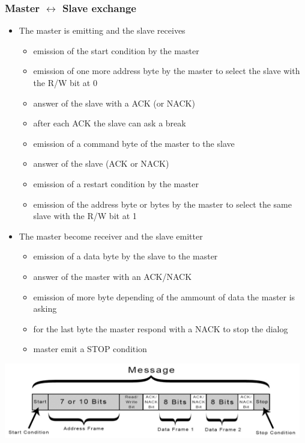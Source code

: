\documentclass[12pt,a4paper,landscape]{article}
\begin{document}
\begin{multicols}{2}
		\subsubsection*{Master $\leftrightarrow$ Slave exchange}

		\begin{itemize}
			\item The master is emitting and the slave receives
			\begin{itemize}
				\item emission of the start condition by the master
				\item emission of one more address byte by the master to select the slave with the R/W bit at 0
				\item answer of the slave with a ACK (or NACK)
				\item after each ACK the slave can ask a break
				\item emission of a command byte of the master to the slave
				\item answer of the slave (ACK or NACK)
				\item emission of a restart condition by the master
				\item emission of the address byte or bytes by the master to select the same slave with the R/W bit at 1
			\end{itemize}
			\item The master become receiver and the slave emitter
			\begin{itemize}
				\item emission of a data byte by the slave to the master
				\item answer of the master with an ACK/NACK
				\item emission of more byte depending of the ammount of data the master is asking
				\item for the last byte the master respond with a NACK to stop the dialog
				\item master emit a STOP condition
			\end{itemize}
		\end{itemize}

		\includegraphics[width=13cm]{I2C_packet.png}

	\end{multicols}
\end{document}
